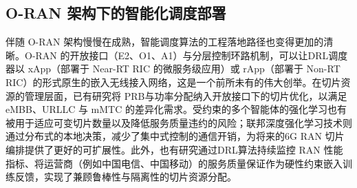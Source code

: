 \subsection{O-RAN 架构下的智能化调度部署}\label{124-o-ran-ux67b6ux6784ux4e0bux7684ux667aux80fdux5316ux8c03ux5ea6ux90e8ux7f72}

伴随 O-RAN 架构慢慢在成熟，智能调度算法的工程落地路径也变得更加的清晰\cite{bonati2021}。O-RAN 的开放接口（E2、O1、A1）与分层控制环路机制，可以让DRL调度器以 xApp（部署于 Near-RT RIC 的微服务级应用）或 rApp（部署于 Non-RT RIC）的形式原生的嵌入无线接入网络，这是一个前所未有的伟大创举\cite{dai2025}。在切片资源的管理层面，已有研究将 PRB与功率分配纳入开放接口下的切片优化，以满足 eMBB、URLLC 与 mMTC 的差异化需求\cite{motalleb2023}。受约束的多个智能体的强化学习也有被用于适应可变切片数量以及降低服务质量违约的风险\cite{zangooei2024}；联邦深度强化学习技术则通过分布式的本地决策，减少了集中式控制的通信开销，为将来的6G RAN 切片编排提供了更好的可扩展性\cite{rezazadeh2023}。此外，也有研究通过DRL算法持续监控 RAN 性能指标、将运营商（例如中国电信、中国移动）的服务质量保证作为硬性约束嵌入训练反馈，实现了兼顾鲁棒性与隔离性的切片资源分配\cite{alcaraz2023}。

